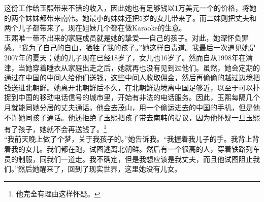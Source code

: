 这份工作给玉熙带来不错的收入，因此她也有足够钱以1万美元一个的价格，将她的两个妹妹都带来南韩。她最小的妹妹还把5岁的女儿带来了。而二妹则把丈夫和两个儿子都带来了。现在姐妹几个都在做Karaoke的生意。\\

玉熙唯一带不出来的家庭成员就是她的挚爱──自己的孩子。对此，她深怀负罪感。“我为了自己的自由，牺牲了我的孩子。”她这样自责道。我最后一次遇见她是2007年的夏天；她的儿子现在已经18岁了，女儿也16岁了。然而自从1998年在清津，当她穿着睡衣从家庭出走之后，她就再也没有见到过他们。虽然，她会定期的通过在中国的中间人给他们送钱，这些中间人收取佣金，然后再偷偷的越过边境把钱送进北朝鲜。她离开北朝鲜后不久，在北朝鲜边境离中国足够近，以至于可以扑捉到中国的移动电话信号的城市里，开始有非法的电话服务。因此，玉熙每隔几个月就能同她分居的丈夫通话。他会去茂山，用一个偷运进去的中国的手机，但是他不许她同孩子通话。他还拒绝了玉熙把孩子带去南韩的提议，因为他怀疑一旦玉熙有了孩子，她就不会再送钱了。\footnote{他完全有理由这样怀疑。}\\

“我前天晚上做了个梦，关于我孩子的。”她告诉我。“我握着我儿子的手。我背上背着我的女儿。我们都在跑，试图逃离北朝鲜。然后有一个很高的人，穿着铁路列车员的制服，同我们一道走。我不确定，但是我想应该是我丈夫，而且他试图阻止我们。”然后她醒来了，回到了现实世界，这里她没有儿女。\\
